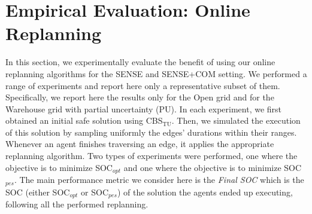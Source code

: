 \documentclass[jair,twoside,11pt,theapa]{article}
\newcommand{\cbstu}{CBS$\mathrm{_{TU}}$\xspace}
\newcommand{\sense}{SENSE\xspace}
\newcommand{\sensecom}{SENSE+COM\xspace}
\newcommand{\socopt}{SOC$_{opt}$\xspace}
\newcommand{\socpes}{SOC$_{pes}$\xspace}
\begin{document}
%





\section{Empirical Evaluation: Online Replanning}
\label{sensingResults}


In this section, we experimentally evaluate the benefit of using our online replanning algorithms for the \sense and \sensecom setting. 
We performed a range of experiments and report here only a representative subset of them. 
Specifically, we report here the results only for the Open grid and for the Warehouse grid with partial uncertainty (PU). 
In each experiment, we first obtained an initial safe solution using \cbstu. 
Then, we simulated the execution of this solution by sampling uniformly the edges' durations within their ranges. 
Whenever an agent finishes traversing an edge, it applies the appropriate replanning algorithm. 
Two types of experiments were performed, one where the objective is to minimize \socopt and one where the objective is to minimize \socpes.  
The main performance metric we consider here is the \emph{Final SOC} which is the SOC (either \socopt or \socpes) of the solution the agents ended up executing, following all the performed replanning. 


\end{document}
